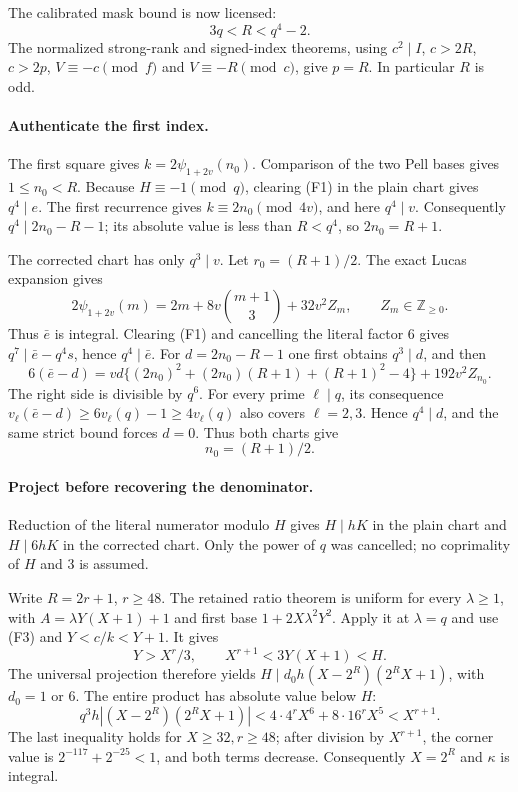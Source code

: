 The calibrated mask bound is now licensed:
\[
 3q<R<q^4-2.
\]
The normalized strong-rank and signed-index theorems, using
\(c^2\mid I\), \(c>2R\), \(c>2p\),
\(V\equiv-c\pmod f\) and \(V\equiv-R\pmod c\), give
\(p=R\). In particular \(R\) is odd.

\paragraph{Authenticate the first index.}
The first square gives \(k=2\psi_{1+2v}(n_0)\).
Comparison of the two Pell bases gives \(1\le n_0<R\).
Because \(H\equiv-1\pmod q\), clearing (F1) in the plain chart
gives \(q^4\mid e\). The first recurrence gives
\(k\equiv2n_0\pmod{4v}\), and here \(q^4\mid v\).
Consequently \(q^4\mid 2n_0-R-1\); its absolute value is less
than \(R<q^4\), so \(2n_0=R+1\).

The corrected chart has only \(q^3\mid v\). Let
\(r_0=(R+1)/2\). The exact Lucas expansion gives
\[
 2\psi_{1+2v}(m)=2m+8v\binom{m+1}{3}+32v^2Z_m,
 \qquad Z_m\in\mathbb Z_{\ge0}.
\]
Thus \(\bar e\) is integral. Clearing (F1) and cancelling the
literal factor 6 gives
\(q^7\mid\bar e-q^4s\), hence \(q^4\mid\bar e\).
For \(d=2n_0-R-1\) one first obtains \(q^3\mid d\), and then
\[
 6(\bar e-d)=vd\{(2n_0)^2+(2n_0)(R+1)+(R+1)^2-4\}
                    +192v^2Z_{n_0}.
\]
The right side is divisible by \(q^6\). For every prime
\(\ell\mid q\), its consequence
\(v_\ell(\bar e-d)\ge6v_\ell(q)-1\ge4v_\ell(q)\)
also covers \(\ell=2,3\). Hence \(q^4\mid d\), and the
same strict bound forces \(d=0\). Thus both charts give
\[
 n_0=(R+1)/2.                                             \tag{F3}
\]

\paragraph{Project before recovering the denominator.}
Reduction of the literal numerator modulo \(H\) gives
\(H\mid hK\) in the plain chart and \(H\mid6hK\) in the
corrected chart. Only the power of \(q\) was cancelled; no coprimality
of \(H\) and 3 is assumed.

Write \(R=2r+1\), \(r\ge48\). The retained ratio theorem is
uniform for every \(\lambda\ge1\), with
\(A=\lambda Y(X+1)+1\) and first base
\(1+2X\lambda^2Y^2\). Apply it at \(\lambda=q\) and use
(F3) and \(Y<c/k<Y+1\). It gives
\[
 Y>X^r/3,\qquad X^{r+1}<3Y(X+1)<H.
\]
The universal projection therefore yields
\(H\mid d_0h(X-2^R)(2^RX+1)\), with \(d_0=1\) or 6.
The entire product has absolute value below \(H\):
\[
 q^3h|(X-2^R)(2^RX+1)|
 <4\cdot4^rX^6+8\cdot16^rX^5<X^{r+1}.
\]
The last inequality holds for \(X\ge32,r\ge48\); after division
by \(X^{r+1}\), the corner value is
\(2^{-117}+2^{-25}<1\), and both terms decrease.
Consequently \(X=2^R\) and \(\kappa\) is integral.

